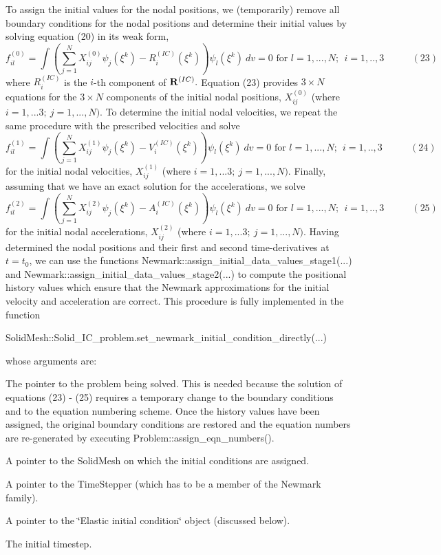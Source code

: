 To assign the initial values for the nodal positions, we (temporarily) remove all boundary conditions for the nodal positions and determine their initial values by solving equation (20) in its weak form, \[ f_{il}^{(0)} = \int \left( \sum_{j=1}^N X_{ij}^{(0)} \psi_j(\xi^k) - R^{(IC)}_i(\xi^k) \right) \psi_l(\xi^k) \ dv = 0 \mbox{ \ \ \ \ for \ \ \ $l=1,...,N; \ \ i=1,..,3$} \ \ \ \ \ \ \ \ \ \ \ \ \ (23) \] where $ R^{(IC)}_i $ is the $i$-\/th component of ${\bf R}^{(IC)}.$ Equation (23) provides $ 3 \times N$ equations for the $ 3 \times N $ components of the initial nodal positions, $ X_{ij}^{(0)} $ (where $i=1,...3; \ j=1,...,N)$. To determine the initial nodal velocities, we repeat the same procedure with the prescribed velocities and solve \[ f_{il}^{(1)} = \int \left( \sum_{j=1}^N X_{ij}^{(1)} \psi_j(\xi^k) - V^{(IC)}_i(\xi^k) \right) \psi_l(\xi^k) \ dv = 0 \mbox{ \ \ \ \ for \ \ \ $l=1,...,N; \ \ i=1,..,3$} \ \ \ \ \ \ \ \ \ \ \ \ \ (24) \] for the initial nodal velocities, $ X_{ij}^{(1)} $ (where $i=1,...3; \ j=1,...,N)$. Finally, assuming that we have an exact solution for the accelerations, we solve \[ f_{il}^{(2)} = \int \left( \sum_{j=1}^N X_{ij}^{(2)} \psi_j(\xi^k) - A^{(IC)}_i(\xi^k) \right) \psi_l(\xi^k) \ dv = 0 \mbox{ \ \ \ \ for \ \ \ $l=1,...,N; \ \ i=1,..,3$} \ \ \ \ \ \ \ \ \ \ \ \ \ (25) \] for the initial nodal accelerations, $ X_{ij}^{(2)} $ (where $i=1,...3; \ j=1,...,N)$. Having determined the nodal positions and their first and second time-\/derivatives at $ t=t_0 $, we can use the functions {\ttfamily Newmark\+::assign\+\_\+initial\+\_\+data\+\_\+values\+\_\+stage1}(...) and {\ttfamily Newmark\+::assign\+\_\+initial\+\_\+data\+\_\+values\+\_\+stage2}(...) to compute the positional history values which ensure that the Newmark approximations for the initial velocity and acceleration are correct. This procedure is fully implemented in the function 
\begin{DoxyCode}
SolidMesh::Solid\_IC\_problem.set\_newmark\_initial\_condition\_directly(...)
\end{DoxyCode}
 whose arguments are\+:
\begin{DoxyItemize}
\item The pointer to the problem being solved. This is needed because the solution of equations (23) -\/ (25) requires a temporary change to the boundary conditions and to the equation numbering scheme. Once the history values have been assigned, the original boundary conditions are restored and the equation numbers are re-\/generated by executing {\ttfamily Problem\+::assign\+\_\+eqn\+\_\+numbers()}.
\item A pointer to the {\ttfamily Solid\+Mesh} on which the initial conditions are assigned.
\item A pointer to the {\ttfamily Time\+Stepper} (which has to be a member of the {\ttfamily Newmark} family).
\item A pointer to the \char`\"{}\+Elastic initial condition\char`\"{} object (discussed below).
\item The initial timestep.
\end{DoxyItemize}

